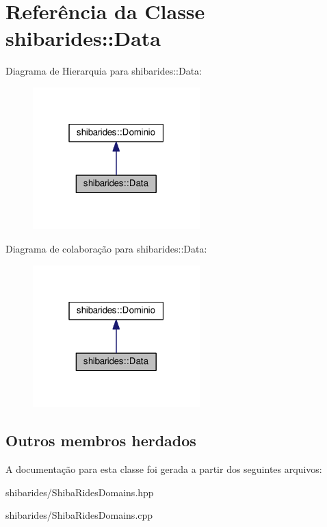 \hypertarget{classshibarides_1_1Data}{}\section{Referência da Classe shibarides\+:\+:Data}
\label{classshibarides_1_1Data}


Diagrama de Hierarquia para shibarides\+:\+:Data\+:\nopagebreak
\begin{figure}[H]
\begin{center}
\leavevmode
\includegraphics[width=183pt]{classshibarides_1_1Data__inherit__graph}
\end{center}
\end{figure}


Diagrama de colaboração para shibarides\+:\+:Data\+:\nopagebreak
\begin{figure}[H]
\begin{center}
\leavevmode
\includegraphics[width=183pt]{classshibarides_1_1Data__coll__graph}
\end{center}
\end{figure}
\subsection*{Outros membros herdados}


A documentação para esta classe foi gerada a partir dos seguintes arquivos\+:\begin{DoxyCompactItemize}
\item 
shibarides/Shiba\+Rides\+Domains.\+hpp\item 
shibarides/Shiba\+Rides\+Domains.\+cpp\end{DoxyCompactItemize}
